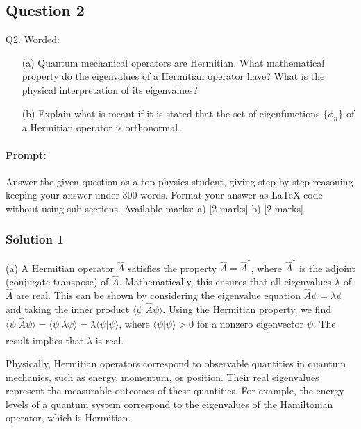 \documentclass{article}
\begin{document}
\subsection{Question 2}
\noindent Q2. Worded:

\begin{enumerate}
    \item[(a)] Quantum mechanical operators are Hermitian. What mathematical property do the eigenvalues of a Hermitian operator have? What is the physical interpretation of its eigenvalues?
    \item[(b)] Explain what is meant if it is stated that the set of eigenfunctions $\{\phi_n\}$ of a Hermitian operator is orthonormal.
\end{enumerate}


\paragraph{Prompt: \\} 
Answer the given question as a top physics student, giving step-by-step reasoning keeping your answer under 300 words. Format your answer as LaTeX code without using sub-sections. Available marks: a) [2 marks] b) [2 marks].

\subsubsection{Solution 1}
(a) A Hermitian operator $\hat{A}$ satisfies the property $\hat{A} = \hat{A}^\dagger$, where $\hat{A}^\dagger$ is the adjoint (conjugate transpose) of $\hat{A}$. Mathematically, this ensures that all eigenvalues $\lambda$ of $\hat{A}$ are real. This can be shown by considering the eigenvalue equation $\hat{A}\psi = \lambda\psi$ and taking the inner product $\langle \psi | \hat{A} \psi \rangle$. Using the Hermitian property, we find $\langle \psi | \hat{A} \psi \rangle = \langle \psi | \lambda \psi \rangle = \lambda \langle \psi | \psi \rangle$, where $\langle \psi | \psi \rangle > 0$ for a nonzero eigenvector $\psi$. The result implies that $\lambda$ is real.

Physically, Hermitian operators correspond to observable quantities in quantum mechanics, such as energy, momentum, or position. Their real eigenvalues represent the measurable outcomes of these quantities. For example, the energy levels of a quantum system correspond to the eigenvalues of the Hamiltonian operator, which is Hermitian. \\
\end{document}
